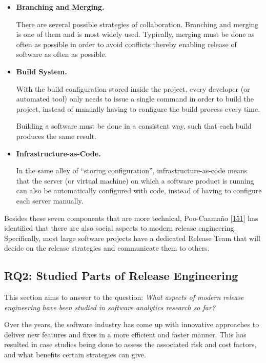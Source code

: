 \documentclass[]{book}
\begin{document}
\begin{itemize}
\item
  \textbf{Branching and Merging.}

  There are several possible strategies of collaboration. Branching and
  merging is one of them and is most widely used. Typically, merging
  must be done as often as possible in order to avoid conflicts thereby
  enabling release of software as often as possible.
\item
  \textbf{Build System.}

  With the build configuration stored inside the project, every
  developer (or automated tool) only needs to issue a single command in
  order to build the project, instead of manually having to configure
  the build process every time.

  Building a software must be done in a consistent way, such that each
  build produces the same result.
\item
  \textbf{Infrastructure-as-Code.}

  In the same alley of ``storing configuration'', infrastructure-as-code
  means that the server (or virtual machine) on which a software product
  is running can also be automatically configured with code, instead of
  having to configure each server manually.
\end{itemize}

Besides these seven components that are more technical, Poo-Caamaño
{[}\protect\hyperlink{ref-poo-caamano2016a}{151}{]} has identified that
there are also social aspects to modern release engineering.
Specifically, most large software projects have a dedicated Release Team
that will decide on the release strategies and communicate them to
others.

\subsection{RQ2: Studied Parts of Release
Engineering}\label{rq2-studied-parts-of-release-engineering}

This section aims to answer to the question: \emph{What aspects of
modern release engineering have been studied in software analytics
research so far?}

Over the years, the software industry has come up with innovative
approaches to deliver new features and fixes in a more efficient and
faster manner. This has resulted in case studies being done to assess
the associated risk and cost factors, and what benefits certain
strategies can give.
\end{document}
